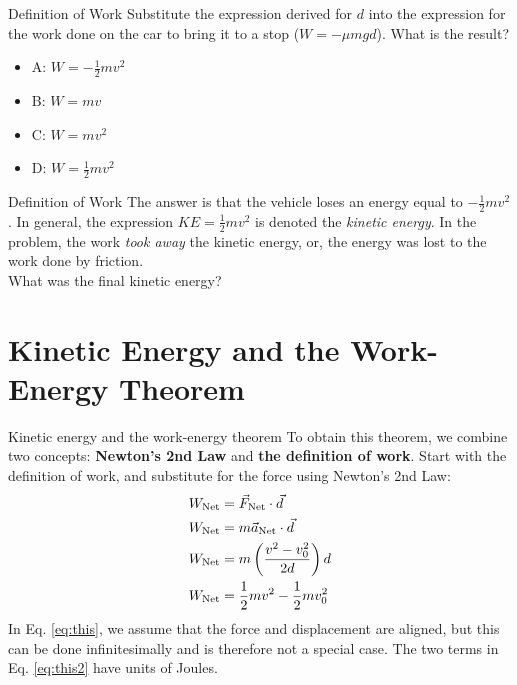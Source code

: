 \documentclass{beamer}
\begin{document}
\begin{frame}{Definition of Work}
Substitute the expression derived for $d$ into the expression for the work done on the car to bring it to a stop ($W = -\mu m g d$).  What is the result?
\begin{itemize}
\item A: $W = -\frac{1}{2} m v^2$
\item B: $W = mv$
\item C: $W = mv^2$
\item D: $W = \frac{1}{2} m v^2$
\end{itemize}
\end{frame}

\begin{frame}{Definition of Work}
The answer is that the vehicle loses an energy equal to $-\frac{1}{2}mv^2$.  In general, the expression $KE = \frac{1}{2}mv^2$ is denoted the \textit{kinetic energy}.  In the problem, the work \textit{took away} the kinetic energy, or, the energy was lost to the work done by friction. \\ \vspace{1cm}
What was the final kinetic energy?
\end{frame}

\section{Kinetic Energy and the Work-Energy Theorem}

\begin{frame}{Kinetic energy and the work-energy theorem}
To obtain this theorem, we combine two concepts: \alert{\textbf{Newton's 2nd Law}} and \alert{\textbf{the definition of work}}.  Start with the definition of work, and substitute for the force using Newton's 2nd Law:
\begin{align}
W_{\rm Net} &= \vec{F}_{\rm Net} \cdot \vec{d} \\
W_{\rm Net} &= m\vec{a}_{\rm Net} \cdot \vec{d} \\
W_{\rm Net} &= m\left(\frac{v^2-v_{\rm 0}^2}{2d}\right) d \label{eq:this} \\
W_{\rm Net} &= \frac{1}{2}mv^2 - \frac{1}{2}mv_{\rm 0}^2 \label{eq:this2}
\end{align}
In Eq. \ref{eq:this}, we assume that the force and displacement are aligned, but this can be done infinitesimally and is therefore not a special case. The two terms in Eq. \ref{eq:this2} have units of Joules.
\end{frame}
\end{document}
